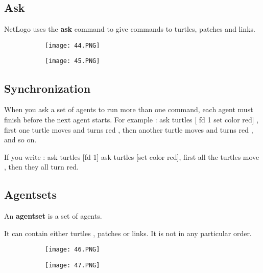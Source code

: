 \documentclass{article}
\begin{document}
  \subsection{Ask}

  NetLogo uses the \textbf{ask} command to give commands to turtles, patches and links.

\begin{figure}[ht!]
  \centering
  \begin{subfigure}[b]{0.5\linewidth}
    \texttt{[image: 44.PNG]}
  \end{subfigure}
     \begin{subfigure}[b]{0.49\textwidth}
         \centering
         \texttt{[image: 45.PNG]}
     \end{subfigure}
\end{figure}

\subsection{Synchronization}

When you ask a set of agents to run more than one command, each agent must finish before the next agent starts. For example : ask turtles [ fd 1 set color red] , first one turtle moves and turns red , then another turtle moves and turns red , and so on.

If you write : ask turtles [fd 1] ask turtles [set color red], first all the turtles move , then they all turn red.

\vspace{60mm}

\subsection{Agentsets}

An \textbf{agentset} is a set of agents. 

It can contain either turtles , patches or links. It is not in any particular order.

\begin{figure}[ht!]
  \centering
  \begin{subfigure}[b]{0.5\linewidth}
    \texttt{[image: 46.PNG]}
  \end{subfigure}
     \begin{subfigure}[b]{0.49\textwidth}
         \centering
         \texttt{[image: 47.PNG]}
     \end{subfigure}
\end{figure}
\end{document}
